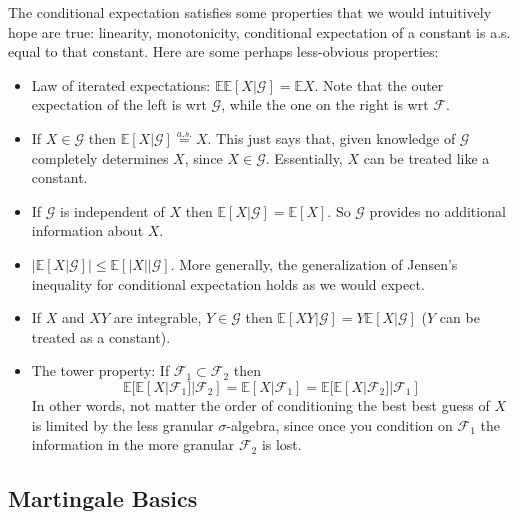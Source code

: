 \documentclass[12pt]{article}
\newcommand*{\abs}[1]{\left\lvert#1\right\rvert}
\newcommand{\E}{\mathbb{E}}
\begin{document}
The conditional expectation satisfies some properties that we would intuitively hope are true: linearity, monotonicity, conditional expectation of a constant is a.s. equal to that constant. Here are some perhaps less-obvious 
properties: 
\begin{itemize}
\item Law of iterated expectations: $\E \E[X|\mathcal{G}] = \E X$. Note that the outer expectation of the left is wrt $\mathcal{G}$, while the one on the right is wrt $\mathcal{F}$. 
\item If $X \in \mathcal{G}$ then $\E[X|\mathcal{G}] \overset{a.s.}{=} X$. This just says that, given knowledge of $\mathcal{G}$ completely determines $X$, since $X \in \mathcal{G}$. Essentially, $X$ can be treated like a constant. 
\item If $\mathcal{G}$ is independent of $X$ then $\E[X|\mathcal{G}] = \E[X]$. So $\mathcal{G}$ provides no additional information about $X$. 
\item $\abs{\E[X|\mathcal{G}]} \leq \E[\abs{X}|\mathcal{G}]$. More generally, the generalization of Jensen's inequality for conditional expectation holds as we would expect. 
\item If $X$ and $XY$ are integrable, $Y \in \mathcal{G}$ then $\E[XY|\mathcal{G}] = Y\E[X|\mathcal{G}]$ ($Y$ can be treated as a constant). 
\item The tower property: If $\mathcal{F}_1 \subset \mathcal{F}_2$ then 
\[\E[\E[X|\mathcal{F}_1]|\mathcal{F}_2] = \E[X|\mathcal{F}_1] = \E[\E[X|\mathcal{F}_2]|\mathcal{F}_1] \]
In other words, not matter the order of conditioning the best best guess of $X$ is limited by the less granular $\sigma$-algebra, since once you condition on $\mathcal{F}_1$ the information in 
the more granular $\mathcal{F}_2$ is lost. 
\end{itemize}

\subsection{Martingale Basics}
\end{document}
